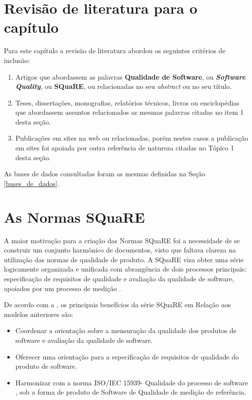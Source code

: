 \section {Revisão de literatura para o capítulo}

Para este capítulo a revisão de literatura abordou os seguintes critérios de inclusão:

\begin{enumerate}

\item  Artigos que abordassem as palavras \textbf{Qualidade de Software}, ou \textbf{\textit{Software Quality}}, ou \textbf{SQuaRE}, ou relacionadas no seu \textit{abstract} ou no seu título.

\item Teses, dissertações, monografias, relatórios técnicos, livros ou enciclopédias que abordassem assuntos relacionados as mesmas palavras citadas no item 1 desta seção.

\item Publicações em sites na web ou relacionadas,  porém nestes casos a publicação em sites foi apoiada por outra referência de natureza citadas no Tópico 1 desta seção.

\end{enumerate}

As bases de dados consultadas foram as mesmas definidas na Seção \ref{bases_de_dados}.


\section{As Normas SQuaRE}
\label{25000}

A maior motivação para a criação das Normas SQuaRE foi a necessidade de se construir um conjunto harmônico de documentos, visto que faltava clareza na utilização das normas de qualidade de produto. A SQuaRE visa obter uma série logicamente organizada e unificada com abrangência de dois processos principais: especificação de requisitos de qualidade e avaliação da qualidade de software, apoiados por um processo de medição \cite{iso_25000}.

De acordo com a , os principais benefícios da série SQuaRE em Relação aos modelos anteriores são:


\begin{itemize}

\item Coordenar a orientação sobre a mensuração da qualidade dos produtos de software e avaliação da qualidade de software. 

\item Oferecer uma orientação para a especificação de requisitos de qualidade do produto de software.

\item Harmonizar com a norma ISO/IEC 15939- Qualidade do processo de software , sob a forma de produto de Software de Qualidade de medição de referência.
 
\end{itemize}

